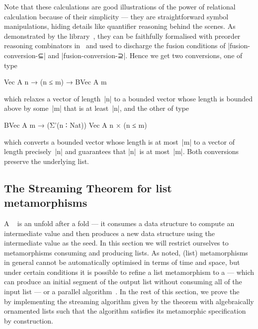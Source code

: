 Note that these calculations are good illustrations of the power of relational calculation because of their simplicity --- they are straightforward symbol manipulations, hiding details like quantifier reasoning behind the scenes.
As demonstrated by the  library~\citep{Mu-AoPA}, they can be faithfully formalised with preorder reasoning combinators in \Agda\ and used to discharge the fusion conditions of |fusion-conversion-⊆| and |fusion-conversion-⊇|.
Hence we get two conversions, one of type
\begin{code}
Vec A n → (n ≤ m) → BVec A m
\end{code}
which relaxes a vector of length~|n| to a bounded vector whose length is bounded above by some~|m| that is at least~|n|, and the other of type
\begin{code}
BVec A m → (Σ'(n ∶ Nat)) Vec A n × (n ≤ m)
\end{code}
which converts a bounded vector whose length is at most~|m| to a vector of length precisely~|n| and guarantees that |n|~is at most~|m|.
Both conversions preserve the underlying list.

\subsection{The Streaming Theorem for list metamorphisms}
\label{sec:metamorphism-streaming}

A ~\citep{Gibbons-metamorphisms} is an unfold after a fold --- it consumes a data structure to compute an intermediate value and then produces a new data structure using the intermediate value as the seed.
In this section we will restrict ourselves to metamorphisms consuming and producing lists.
As \citeauthor{Gibbons-metamorphisms} noted, (list) metamorphisms in general cannot be automatically optimised in terms of time and space, but under certain conditions it is possible to refine a list metamorphism to a  --- which can produce an initial segment of the output list without consuming all of the input list --- or a parallel algorithm~\citep{Nakano-jigsaw}.
In the rest of this section, we prove the ~\citep[Theorem~30]{Bird-arithmetic-coding} by implementing the streaming algorithm given by the theorem with algebraically ornamented lists such that the algorithm satisfies its metamorphic specification by construction.

